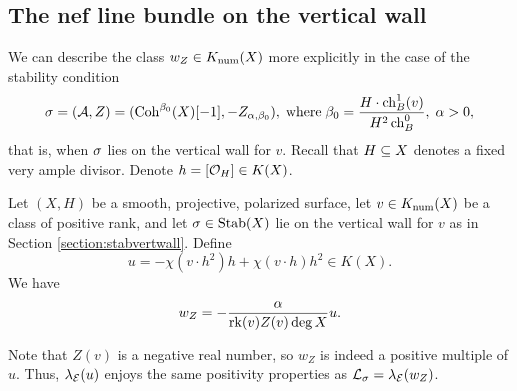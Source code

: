 \subsection{The nef line bundle on the vertical wall}
We can describe the class $w_Z \in K_{\mathrm{num}}(X)$ more explicitly in the case of the stability condition 
\[ \sigma = (\mathcal{A}, Z) = (\operatorname{\mathrm{Coh}}^{\beta_0}(X)[-1], -Z_{\alpha, \beta_0}), \; \mathrm{where} \; \beta_0 = \frac{H \cdot \operatorname{\mathrm{ch}}_B^1(v)}{H^2 \operatorname{\mathrm{ch}}_B^0}, \; \alpha > 0, \] that is, when $\sigma$ lies on the vertical wall for $v$. Recall that $H \subseteq X$ denotes a fixed very ample divisor. Denote $h = [\mathcal{O}_H] \in K(X)$.
\begin{propdef}\label{nefclassonverticalwall}
    Let $(X,H)$ be a smooth, projective, polarized surface, let $v \in K_{\mathrm{num}}(X)$ be a class of positive rank, and let $\sigma \in \operatorname{\mathrm{Stab}}(X)$ lie on the vertical wall for $v$ as in Section \ref{section:stabvertwall}. Define 
    \[ u = -\chi(v \cdot h^2) h + \chi(v \cdot h) h^2 \in K(X). \]
    We have 
    \[ w_Z = -\frac{\alpha}{\operatorname{\mathrm{rk}}(v) Z(v) \deg X} u. \]
\end{propdef}
Note that $Z(v)$ is a negative real number, so $w_Z$ is indeed a positive multiple of $u$. Thus, $\lambda_{\mathcal{E}}(u)$ enjoys the same positivity properties as $\mathcal{L}_\sigma = \lambda_{\mathcal{E}}(w_Z)$.

